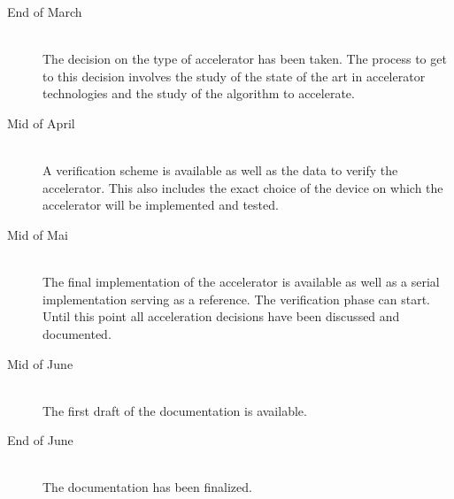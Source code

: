 \documentclass[12pt]{article} %
\begin{document}
\begin{description}
    \item[End of March] \hfill \\
        The decision on the type of accelerator has been taken. The process to
        get to this decision involves the study of the state of the art in
        accelerator technologies and the study of the algorithm to accelerate.
    \item[Mid of April] \hfill \\
        A verification scheme is available as well as the data to verify the
        accelerator. This also includes the exact choice of the device on which
        the accelerator will be implemented and tested.
    \item[Mid of Mai] \hfill \\
        The final implementation of the accelerator is available as well as
        a serial implementation serving as a reference. The verification phase
        can start. Until this point all acceleration decisions have been
        discussed and documented.
    \item[Mid of June] \hfill \\
        The first draft of the documentation is available.
    \item[End of June] \hfill \\
        The documentation has been finalized.
\end{description}

%



\end{document}
